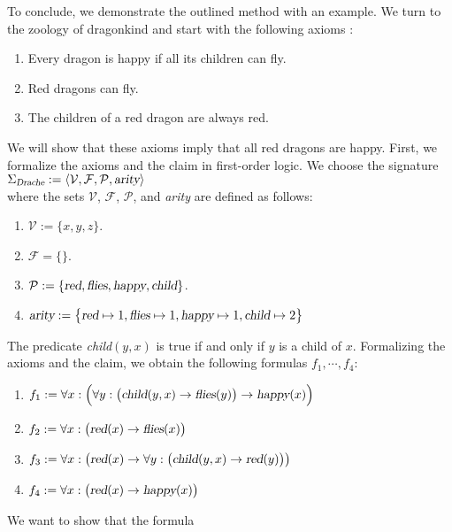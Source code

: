 \exampleEng
To conclude, we demonstrate the outlined method with an example.  We turn to the zoology of dragonkind and
start with the following axioms \cite{schoening:2008}:
\begin{enumerate}
\item Every dragon is happy if all its children can fly.
\item Red dragons can fly.
\item The children of a red dragon are always red.
\end{enumerate}
We will show that these axioms imply that all red dragons are happy.
First, we formalize the axioms and the claim in first-order logic.
We choose the signature \\[0.2cm]
\hspace*{1.3cm}
$\Sigma_\textsl{Drache} := \langle \mathcal{V}, \mathcal{F}, \mathcal{P}, \textsl{arity} \rangle$ 
\\[0.2cm]
where the sets $\mathcal{V}$, $\mathcal{F}$, $\mathcal{P}$, and \textsl{arity} are defined as follows:
\begin{enumerate}
\item $\mathcal{V} := \{x,y,z\}$.
\item $\mathcal{F} = \{\}$.
\item $\mathcal{P} := \{ \textsl{red}, \textsl{flies}, \textsl{happy}, \textsl{child} \}$.
\item $\textsl{arity} := \bigl\{ \textsl{red} \mapsto 1, \textsl{flies} \mapsto 1,
         \textsl{happy} \mapsto 1, \textsl{child} \mapsto 2\bigr\}$
\end{enumerate}
The predicate \textsl{child}$(y,x)$ is true if and only if $y$ is a child of $x$.
Formalizing the axioms and the claim, we obtain the following
formulas $f_1, \cdots, f_4$:
\begin{enumerate}
\item $f_1 := \forall x: \Bigl(\forall y: \big(\textsl{child}(y,x) \rightarrow \textsl{flies}(y)\big) \rightarrow \textsl{happy}(x)\Bigr)$
\item $f_2 := \forall x: \bigl(\textsl{red}(x) \rightarrow \textsl{flies}(x)\bigr)$
\item $f_3 := \forall x: \bigl(\textsl{red}(x) \rightarrow \forall y:\bigl( \textsl{child}(y,x) \rightarrow \textsl{red}(y)\bigr)\bigr)$
\item $f_4 := \forall x: \bigl(\textsl{red}(x) \rightarrow \textsl{happy}(x)\bigr)$
\end{enumerate}
We want to show that the formula 
\\[0.2cm]
